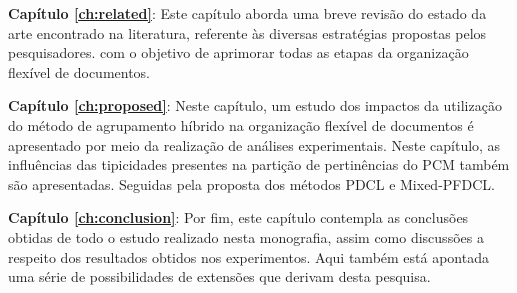 {\bf Capítulo \ref{ch:related}\/}: Este capítulo aborda uma breve revisão do estado da arte encontrado
na literatura, referente às diversas estratégias propostas pelos pesquisadores. com o objetivo de
aprimorar todas as etapas da organização flexível de documentos. 

{\bf Capítulo \ref{ch:proposed}\/}: Neste capítulo, um estudo dos impactos da
utilização do método de agrupamento híbrido na organização flexível de documentos é apresentado por meio da realização de análises experimentais. Neste capítulo, as influências das tipicidades presentes
na partição de pertinências do PCM também são apresentadas. Seguidas pela proposta dos métodos PDCL e Mixed-PFDCL. 

{\bf Capítulo \ref{ch:conclusion}\/}: Por fim, este capítulo contempla as conclusões obtidas de todo o estudo
realizado nesta monografia, assim como discussões a respeito dos resultados obtidos nos
experimentos. Aqui também está apontada uma série de possibilidades de extensões que derivam desta
pesquisa. 

